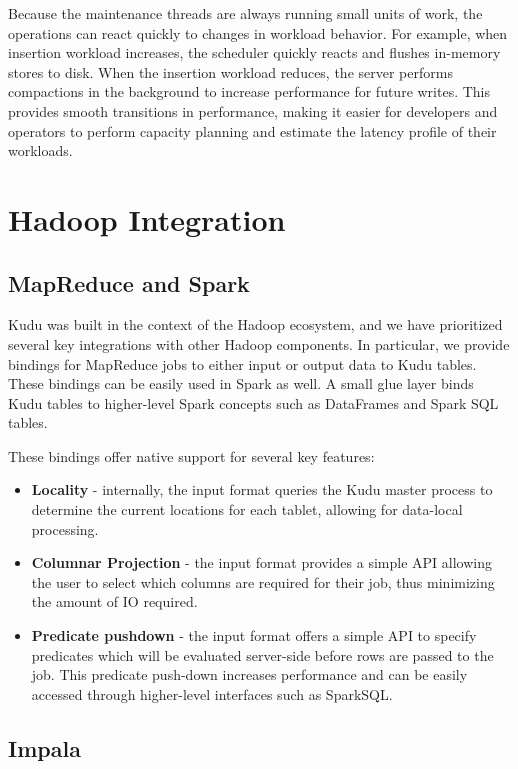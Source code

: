 \documentclass{vldb}
\begin{document}
Because the maintenance threads are always running small units of work, the operations
can react quickly to changes in workload behavior. For example, when insertion workload
increases, the scheduler quickly reacts and flushes in-memory stores to disk. When
the insertion workload reduces, the server performs compactions in the background
to increase performance for future writes. This provides smooth transitions in performance,
making it easier for developers and operators to perform capacity planning and
estimate the latency profile of their workloads.

\section{Hadoop Integration}
\label{sec:integration}

\subsection{MapReduce and Spark}

Kudu was built in the context of the Hadoop ecosystem, and we have prioritized several
key integrations with other Hadoop components. In particular, we provide bindings for
MapReduce jobs to either input or output data to Kudu tables. These bindings can be
easily used in Spark\cite{spark} as well. A small glue layer binds Kudu tables to higher-level
Spark concepts such as DataFrames and Spark SQL tables.

These bindings offer native support for several key features:
\begin{itemize}
\item {\bf Locality} - internally, the input format queries the Kudu master process to determine
the current locations for each tablet, allowing for data-local processing.
\item {\bf Columnar Projection} - the input format provides a simple API allowing the user to
select which columns are required for their job, thus minimizing the amount of IO required.
\item {\bf Predicate pushdown} - the input format offers a simple API to specify predicates
which will be evaluated server-side before rows are passed to the job. This predicate push-down
increases performance and can be easily accessed through higher-level interfaces such as
SparkSQL.
\end{itemize}

\subsection{Impala}
\end{document}
